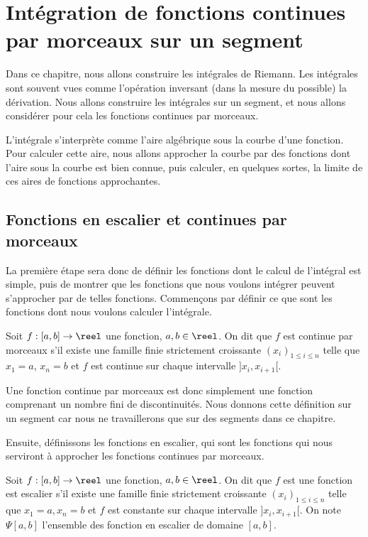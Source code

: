 \section{Intégration de fonctions continues par morceaux sur un segment}

Dans ce chapitre, nous allons construire les intégrales de Riemann. Les intégrales sont souvent vues comme l'opération inversant (dans la mesure du possible) la dérivation. Nous allons construire les intégrales sur un segment, et nous allons considérer pour cela les fonctions continues par morceaux.

L'intégrale s'interprète comme l'aire algébrique sous la courbe d'une fonction. Pour calculer cette aire, nous allons approcher la courbe par des fonctions dont l'aire sous la courbe est bien connue, puis calculer, en quelques sortes, la limite de ces aires de fonctions approchantes.

\subsection{Fonctions en escalier et continues par morceaux}

La première étape sera donc de définir les fonctions dont le calcul de l'intégral est simple, puis de montrer que les fonctions que nous voulons intégrer peuvent s'approcher par de telles fonctions. Commençons par définir ce que sont les fonctions dont nous voulons calculer l'intégrale.

\begin{defi}
    Soit $f : [a,b] \to\reel$ une fonction, $a,b\in \reel$. On dit que $f$ est continue par morceaux s'il existe une famille finie strictement croissante $(x_i)_{1\leq i\leq n}$ telle que $x_1 = a$, $x_n = b$ et $f$ est continue sur chaque intervalle $]x_i,x_{i+1}[$.
\end{defi}

\begin{rmk}
    Une fonction continue par morceaux est donc simplement une fonction comprenant un nombre fini de discontinuités. Nous donnons cette définition sur un segment car nous ne travaillerons que sur des segments dans ce chapitre.
\end{rmk}

Ensuite, définissons les fonctions en escalier, qui sont les fonctions qui nous serviront à approcher les fonctions continues par morceaux.

\begin{defi}
    Soit $f : [a,b]\to\reel$ une fonction, $a,b\in\reel$. On dit que $f$ est une fonction est escalier s'il existe une famille finie strictement croissante $(x_i)_{1\leq i\leq n}$ telle que $x_1=a,x_n=b$ et $f$ est constante sur chaque intervalle $]x_i,x_{i+1}[$. On note $\Psi{[a,b]}$ l'ensemble des fonction en escalier de domaine $[a,b]$.
\end{defi}

